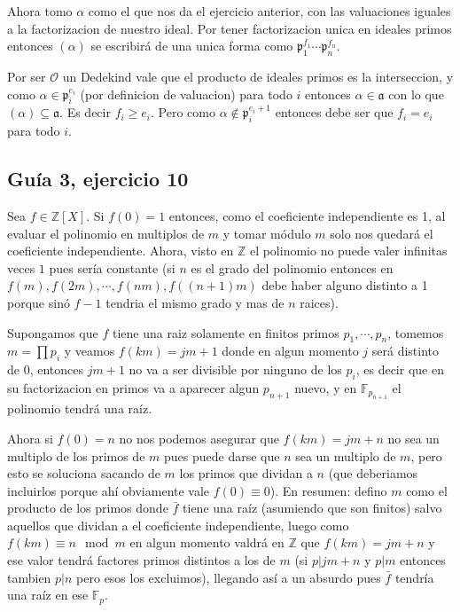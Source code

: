 \documentclass[12pt]{amsart}
\newcommand{\ZZ}{\mathbb{Z}}
\newcommand{\FF}{\mathbb{F}}
\newcommand{\pp}{\mathfrak{p}}
\newcommand{\aaa}{\mathfrak{a}}
\newcommand{\OO}{\mathcal{O}}
\theoremstyle{plain}
\begin{document}
Ahora tomo $\alpha$ como el que nos da el ejercicio anterior, con las 
valuaciones iguales a la factorizacion de nuestro ideal. Por tener 
factorizacion unica en ideales primos entonces $(\alpha)$ se escribirá
de una unica forma como $\pp_1^{f_1}\cdots\pp_n^{f_n}$.

Por ser $\OO$ un Dedekind vale que el producto de ideales primos es la 
interseccion, y como $\alpha \in \pp_i^{e_i}$ (por definicion de valuacion)
para todo $i$ entonces $\alpha \in \aaa$ con lo que $(\alpha)\subseteq\aaa$.
Es decir $f_i\geq e_i$. Pero como $\alpha \notin \pp_i^{e_i+1}$ entonces 
debe ser que $f_i=e_i$ para todo $i$.


\subsection*{Guía 3, ejercicio 10}

Sea $f\in \ZZ[X]$. Si $f(0)=1$ entonces, como el coeficiente 
independiente es 1, al evaluar el polinomio en multiplos de $m$ y 
tomar módulo $m$ solo nos quedará el coeficiente independiente. Ahora,
visto en $\ZZ$ el polinomio no puede valer infinitas veces $1$ pues 
sería constante (si $n$ es el grado del polinomio entonces en $f(m), 
f(2m), \cdots, f(nm), f((n+1)m)$ debe haber alguno distinto a 1 
porque sinó $f-1$ tendria el mismo grado y mas de $n$ raices). 

Supongamos que $f$ tiene una raiz solamente en finitos primos $p_1,
\cdots, p_n$, tomemos $m=\prod p_i$ y veamos $f(km) = jm+1$ donde en
algun momento $j$ será distinto de 0, entonces $jm+1$ no va a ser 
divisible por ninguno de los $p_i$, es decir que en su factorizacion 
en primos va a aparecer algun $p_{n+1}$ nuevo, y en $\FF_{p_{n+1}}$
el polinomio tendrá una raíz.

Ahora si $f(0) = n$ no nos podemos asegurar que $f(km) = jm+n$ no 
sea un multiplo de los primos de $m$ pues puede darse que $n$ sea un
multiplo de $m$, pero esto se soluciona sacando de $m$ los primos que 
dividan a $n$ (que deberiamos incluirlos porque ahí obviamente vale 
$f(0)\equiv 0$). En resumen: defino $m$ como el producto de los primos
donde $\bar{f}$ tiene una raíz (asumiendo que son finitos) salvo 
aquellos que dividan a el coeficiente independiente, luego como 
$f(km) \equiv n \mod m$ en algun momento valdrá en $\ZZ$ que 
$f(km) = jm+n$ y ese valor tendrá factores primos distintos a los de 
$m$ (si $p|jm+n$ y $p|m$ entonces tambien $p|n$ pero esos los 
excluimos), llegando así a un absurdo pues $\bar{f}$ tendría una raíz 
en ese $\FF_p$.
\end{document}
